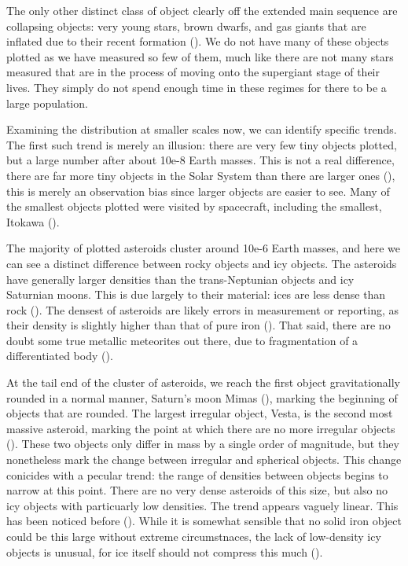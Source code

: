\documentclass[twocolumn,linenumbers]{aastex631}
\begin{document}
The only other distinct class of object clearly off the extended main sequence are collapsing objects: very young stars, brown dwarfs, and gas giants that are inflated due to their recent formation (). We do not have many of these objects plotted as we have measured so few of them, much like there are not many stars measured that are in the process of moving onto the supergiant stage of their lives. They simply do not spend enough time in these regimes for there to be a large population. 

Examining the distribution at smaller scales now, we can identify specific trends. The first such trend is merely an illusion: there are very few tiny objects plotted, but a large number after about 10e-8 Earth masses. This is not a real difference, there are far more tiny objects in the Solar System than there are larger ones (), this is merely an observation bias since larger objects are easier to see. Many of the smallest objects plotted were visited by spacecraft, including the smallest, Itokawa ().  

The majority of plotted asteroids cluster around 10e-6 Earth masses, and here we can see a distinct difference between rocky objects and icy objects. The asteroids have generally larger densities than the trans-Neptunian objects and icy Saturnian moons. This is due largely to their material: ices are less dense than rock (). The densest of asteroids are likely errors in measurement or reporting, as their density is slightly higher than that of pure iron (). That said, there are no doubt some true metallic meteorites out there, due to fragmentation of a differentiated body (). 

At the tail end of the cluster of asteroids, we reach the first object gravitationally rounded in a normal manner, Saturn's moon Mimas (), marking the beginning of objects that are rounded. The largest irregular object, Vesta, is the second most massive asteroid, marking the point at which there are no more irregular objects (). These two objects only differ in mass by a single order of magnitude, but they nonetheless mark the change between irregular and spherical objects. This change conicides with a pecular trend: the range of densities between objects begins to narrow at this point. There are no very dense asteroids of this size, but also no icy objects with particuarly low densities. The trend appears vaguely linear. This has been noticed before (). While it is somewhat sensible that no solid iron object could be this large without extreme circumstnaces, the lack of low-density icy objects is unusual, for ice itself should not compress this much (). 
\end{document}
